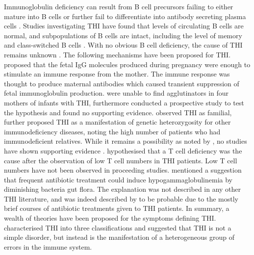 \documentclass[12pt]{article}
\begin{document}
			Immunoglobulin deficiency can result from B cell precursors failing to either mature into B cells or further fail to differentiate into antibody secreting plasma cells \citep{Fiorilli86}. 
			Studies investigating THI have found that levels of circulating B cells are normal, and subpopulations of B cells are intact, including the level of memory and class-switched B cells \citep{Tiller78,Stiemh80,Siegel81,Buckley83,Fiorilli86,Dressler89}.
			With no obvious B cell deficiency, the cause of THI remains unknown \citep{AlHerz14}. 
			The following mechanisms have been proposed for THI.
			\citet{Fudenberg64} proposed that the fetal IgG molecules produced during pregnancy were enough to stimulate an immune response from the mother. 
			The immune response was thought to produce maternal antibodies which caused transient suppression of fetal immunoglobulin production. 
			\citet{Rosen66} were unable to find agglutinators in four mothers of infants with THI, furthermore \citet{Nathenson71} conducted a prospective study to test the hypothesis and found no supporting evidence.
			\citet{Willenbockel60} observed THI as familial, \citet{Soothill68} further proposed THI as a manifestation of genetic heterozygosity for other immunodeficiency diseases, noting the high number of patients who had immunodeficient relatives.
			While it remains a possibility as noted by \citet{McGeady87}, no studies have shown supporting evidence \citep{Tiller78,Fiorilli86, Ovadia14}.
			\citet{Siegel81} hypothesised that a T cell deficiency was the cause after the observation of low T cell numbers in THI patients.
			Low T cell numbers have not been observed in proceeding studies.
			\citet{McGeady87} mentioned a suggestion that frequent antibiotic treatment could induce hypogammaglobulinemia by diminishing bacteria gut flora. 
			The explanation was not described in any other THI literature, and was indeed described by \citet{McGeady87} to be probable due to the mostly brief courses of antibiotic treatments given to THI patients.
			In summary, a wealth of theories have been proposed for the symptoms defining THI. 
			\citet{Dalal98} characterised THI into three classifications and suggested that THI is not a simple disorder, but instead is the manifestation of a heterogeneous group of errors in the immune system.
			
\end{document}

